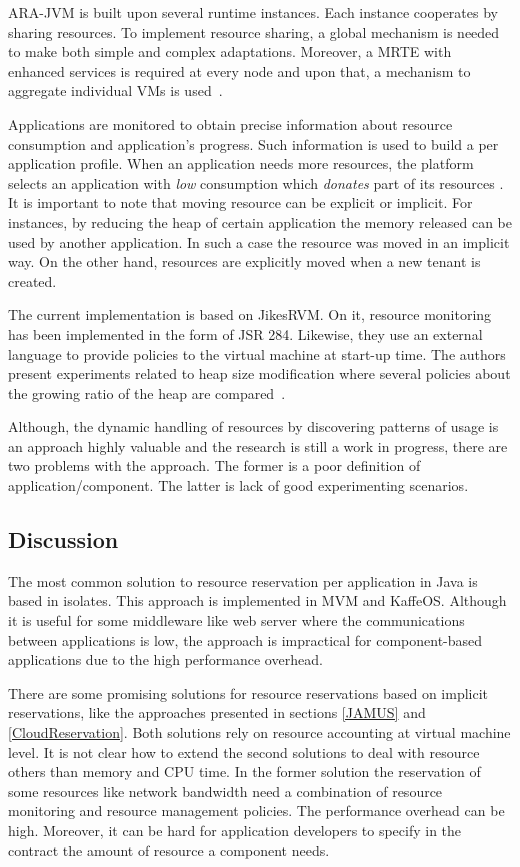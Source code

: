 ARA-JVM is built upon several runtime instances.
Each instance cooperates by sharing resources.
To implement resource sharing, a global mechanism is needed to make both simple and complex adaptations.
Moreover, a MRTE with enhanced services is required at every node and upon that, a mechanism to aggregate individual VMs is used~\cite{Simao:2012:VEJ:2310096.2310158}.

Applications are monitored to obtain precise information about resource consumption and application's progress.
Such information is used to build a per application profile.
When an application needs more resources, the platform selects an application with \textit{low} consumption which \textit{donates} part of its resources \cite{Simao:2012:VEJ:2310096.2310158}.
It is important to note that moving resource can be explicit or implicit.
For instances, by reducing the heap of certain application the memory released can be used by another application.
In such a case the resource was moved in an implicit way.
On the other hand, resources are explicitly moved when a new tenant is created.

The current implementation is based on JikesRVM.
On it, resource monitoring has been implemented in the form of JSR 284.
Likewise, they use an external language to provide policies to the virtual machine at start-up time.
The authors present experiments related to heap size modification where several policies about the growing ratio of the heap are compared~\cite{Simao:2012:VEJ:2310096.2310158}.

Although, the dynamic handling of resources by discovering patterns of usage is an approach highly valuable and the research is still a work in progress, there are two problems with the approach.
The former is a poor definition of application/component.
The latter is lack of good experimenting scenarios.


\subsection{Discussion}

The most common solution to resource reservation per application in Java is based in isolates. This approach is implemented in MVM and KaffeOS. Although it is useful for some middleware like web server where the communications between applications is low, the approach is impractical for component-based applications due to the high performance overhead.

There are some promising solutions for resource reservations based on implicit reservations, like the approaches presented in sections \ref{JAMUS} and \ref{CloudReservation}. Both solutions rely on resource accounting at virtual machine level. It is not clear how to extend the second solutions to deal with resource others than memory and CPU time. In the former solution the reservation of some resources like network bandwidth need a combination of resource monitoring and resource management policies. The performance overhead can be high. Moreover, it can be hard for application developers to specify in the contract the amount of resource a component needs.

